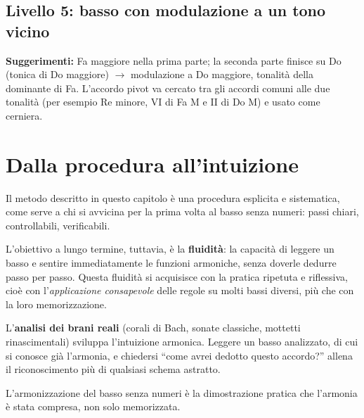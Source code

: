 \subsection{Livello 5: basso con modulazione a un tono vicino}


\textbf{Suggerimenti:} Fa maggiore nella prima parte; la seconda parte finisce su Do (tonica di Do maggiore) $\rightarrow$ modulazione a Do maggiore, tonalità della dominante di Fa. L'accordo pivot va cercato tra gli accordi comuni alle due tonalità (per esempio Re minore, VI di Fa M e II di Do M) e usato come cerniera.

\section{Dalla procedura all'intuizione}
\label{sec:dall_procedura_intuizione}

Il metodo descritto in questo capitolo è una procedura esplicita e sistematica, come serve a chi si avvicina per la prima volta al basso senza numeri: passi chiari, controllabili, verificabili.

L'obiettivo a lungo termine, tuttavia, è la \textbf{fluidità}: la capacità di leggere un basso e sentire immediatamente le funzioni armoniche, senza doverle dedurre passo per passo. Questa fluidità si acquisisce con la pratica ripetuta e riflessiva, cioè con l'\textit{applicazione consapevole} delle regole su molti bassi diversi, più che con la loro memorizzazione.

\begin{osservazione}
	\label{oss:analisi_brani}
	L'\textbf{analisi dei brani reali} (corali di Bach, sonate classiche, mottetti rinascimentali) sviluppa l'intuizione armonica. Leggere un basso analizzato, di cui si conosce già l'armonia, e chiedersi ``come avrei dedotto questo accordo?'' allena il riconoscimento più di qualsiasi schema astratto.
\end{osservazione}

L'armonizzazione del basso senza numeri è la dimostrazione pratica che l'armonia è stata compresa, non solo memorizzata.
